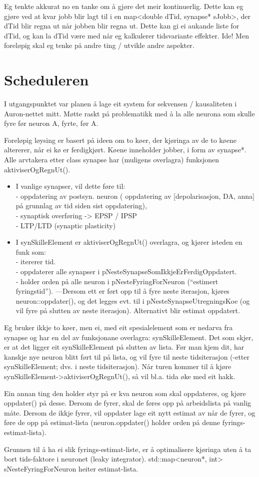 Eg tenkte akkurat no en tanke om å gjøre det meir kontinuerlig. Dette kan eg gjøre ved at kvar jobb blir lagt til i en map<double dTid, synapse* sJobb>, der dTid blir regna ut når jobben blir regna ut. Dette kan gi ei aukande liste for dTid, og kan la dTid være med når eg kalkulerer tidsvariante effekter. Ide! Men foreløpig skal eg tenke på andre ting / utvikle andre aspekter.


\section{Scheduleren}
I utgangspunktet var planen å lage eit system for sekvensen / kausaliteten i Auron-nettet mitt. Møtte raskt på problematikk med å la alle neurona som skulle fyre før neuron A, fyrte, før A.

Foreløpig løysing er basert på ideen om to køer, der kjøringa av de to køene altererer, når ei kø er ferdigkjørt. Køene inneholder jobber, i form av synapse*. Alle arvtakera etter class synapse har (muligens overlagra) funksjonen aktiviserOgRegnUt(). 
\begin{itemize}
	\item I vanlige synapser, vil dette føre til:
		\\ - oppdatering av postsyn. neuron ( oppdatering av [depolarisasjon, DA, anna] på grunnlag av tid siden sist oppdatering), 
		\\ - synaptisk overføring -> EPSP / IPSP
		\\ - LTP/LTD (synaptic plasticity)
	\item I synSkilleElement er aktiviserOgRegnUt() overlagra, og kjører isteden en funk som: 
		\\ - itererer tid. 
		\\ - oppdaterer alle synapser i pNesteSynapseSomIkkjeErFerdigOppdatert.
		\\ - holder orden på alle neuron i pNesteFyringForNeuron (``estimert fyringstid''). ---Dersom ett er ført opp til å fyre neste iterasjon, kjøres neuron::oppdater(), og det legges evt. til i pNesteSynapseUtregningsKoe (og vil fyre på slutten av neste iterasjon). Alternativt blir estimat oppdatert.
\end{itemize}
Eg bruker ikkje to køer, men ei, med eit spesialelement som er nedarva fra synapse og har en del av funksjonane overlagra: synSkilleElement. Det som skjer, er at det ligger eit synSkilleElement på slutten av lista. 
Før man kjem dit, har kanskje nye neuron blitt ført til på lista, og vil fyre til neste tidsiterasjon (-etter synSkilleElement; dvs. i neste tidsiterasjon). Når turen kommer til å kjøre synSkilleElement->aktiviserOgRegnUt(), så vil bl.a. tida øke med eit hakk.

Ein annan ting den holder styr på er kva neuron som skal oppdateres, og kjøre oppdater() på desse. Dersom de fyrer, skal de føres opp på arbeidslista på vanlig måte. Dersom de ikkje fyrer, vil oppdater lage eit nytt estimat av når de fyrer, og føre de opp på estimat-lista (neuron.oppdater() holder orden på denne fyrings-estimat-lista).

Grunnen til å ha ei slik fyrings-estimat-liste, er å optimalisere kjøringa uten å ta bort tids-faktore i neuronet (leaky integrator).
std::map<neuron*, int> sNesteFyringForNeuron heiter estimat-lista.

